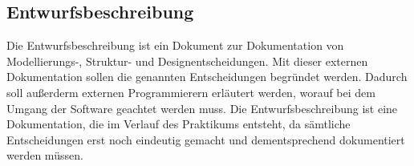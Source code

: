 \subsection{Entwurfsbeschreibung}
Die Entwurfsbeschreibung ist ein Dokument zur Dokumentation von Modellierungs-, Struktur- und Designentscheidungen. Mit dieser externen Dokumentation sollen die genannten Entscheidungen begründet werden. Dadurch soll außerderm externen Programmierern erläutert werden, worauf bei dem Umgang der Software geachtet werden muss. Die Entwurfsbeschreibung ist eine Dokumentation, die im Verlauf des Praktikums entsteht, da sämtliche Entscheidungen erst noch eindeutig gemacht und dementsprechend dokumentiert werden müssen.